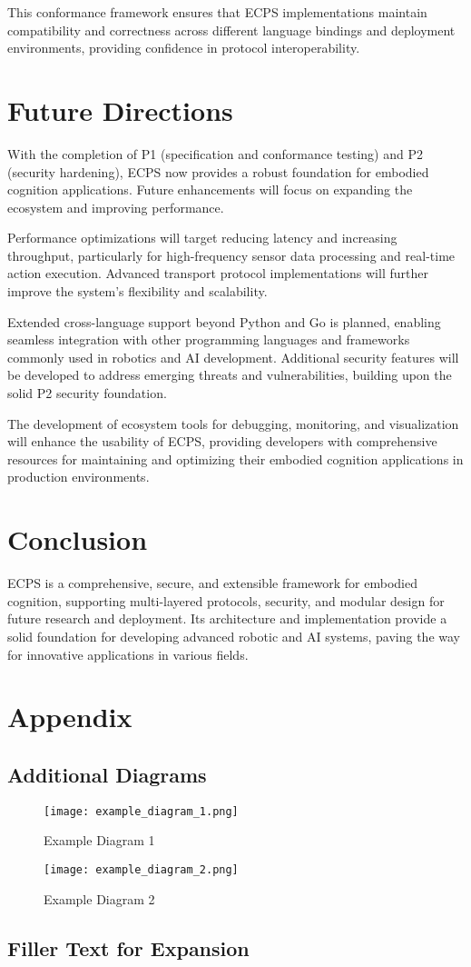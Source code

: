 \documentclass[12pt]{article}
\begin{document}
This conformance framework ensures that ECPS implementations maintain compatibility and correctness across different language bindings and deployment environments, providing confidence in protocol interoperability.

\section{Future Directions}
With the completion of P1 (specification and conformance testing) and P2 (security hardening), ECPS now provides a robust foundation for embodied cognition applications. Future enhancements will focus on expanding the ecosystem and improving performance.

Performance optimizations will target reducing latency and increasing throughput, particularly for high-frequency sensor data processing and real-time action execution. Advanced transport protocol implementations will further improve the system's flexibility and scalability.

Extended cross-language support beyond Python and Go is planned, enabling seamless integration with other programming languages and frameworks commonly used in robotics and AI development. Additional security features will be developed to address emerging threats and vulnerabilities, building upon the solid P2 security foundation.

The development of ecosystem tools for debugging, monitoring, and visualization will enhance the usability of ECPS, providing developers with comprehensive resources for maintaining and optimizing their embodied cognition applications in production environments.

\section{Conclusion}
ECPS is a comprehensive, secure, and extensible framework for embodied cognition, supporting multi-layered protocols, security, and modular design for future research and deployment. Its architecture and implementation provide a solid foundation for developing advanced robotic and AI systems, paving the way for innovative applications in various fields.

\newpage
\section{Appendix}
\subsection{Additional Diagrams}
\begin{figure}[H]
\centering
\texttt{[image: example\_diagram\_1.png]}
\caption{Example Diagram 1}
\end{figure}

\begin{figure}[H]
\centering
\texttt{[image: example\_diagram\_2.png]}
\caption{Example Diagram 2}
\end{figure}

\subsection{Filler Text for Expansion}
\lipsum[1-20] %
\end{document}
